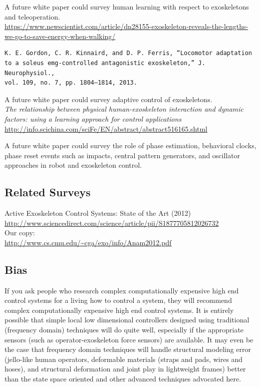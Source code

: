 \documentclass[letterpaper,12pt,fullpage]{article}
\begin{document}
A future white paper could survey human learning with respect to exoskeletons
and teleoperation.\\
\url{https://www.newscientist.com/article/dn28155-exoskeleton-reveals-the-lengths-we-go-to-save-energy-when-walking/}\\

\begin{verbatim}
K. E. Gordon, C. R. Kinnaird, and D. P. Ferris, “Locomotor adaptation
to a soleus emg-controlled antagonistic exoskeleton,” J. Neurophysiol.,
vol. 109, no. 7, pp. 1804–1814, 2013.
\end{verbatim}

A future white paper could survey adaptive control of exoskeletons.\\
{\it
The relationship between physical human-exoskeleton interaction and
dynamic factors: using a learning approach for control applications}\\
\url{http://info.scichina.com/sciFe/EN/abstract/abstract516165.shtml}

A future white paper could survey the role of phase estimation, behavioral clocks,  phase reset events such as impacts, central pattern generators,
and oscillator approaches in robot and exoskeleton control.

\subsection{Related Surveys}

Active Exoskeleton Control Systems: State of the Art (2012)\\
\url{http://www.sciencedirect.com/science/article/pii/S1877705812026732}\\
Our copy:\\
\url{http://www.cs.cmu.edu/~cga/exo/info/Anam2012.pdf}

\subsection{Bias}

If you ask people who research complex computationally expensive
high end control
systems for a living how to control a system,
they will recommend complex computationally expensive high end control systems.
It is entirely possible that simple local low dimensional controllers
designed using traditional (frequency domain) techniques will do
quite well, especially if the appropriate sensors (such as 
operator-exoskeleton force sensors) are available.
It may even be the case that frequency domain techniques will handle
structural modeling error (jello-like human operators, deformable materials
(straps and pads, wires and hoses), and structural deformation and joint
play in lightweight frames) better than the state space oriented 
and other advanced techniques advocated here.
\end{document}
